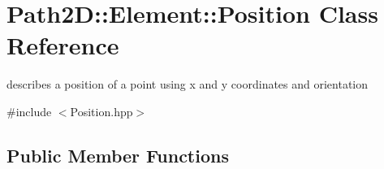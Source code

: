 \hypertarget{class_path2_d_1_1_element_1_1_position}{}\section{Path2D\+:\+:Element\+:\+:Position Class Reference}
\label{class_path2_d_1_1_element_1_1_position}


describes a position of a point using x and y coordinates and orientation  




{\ttfamily \#include $<$Position.\+hpp$>$}

\subsection*{Public Member Functions}
